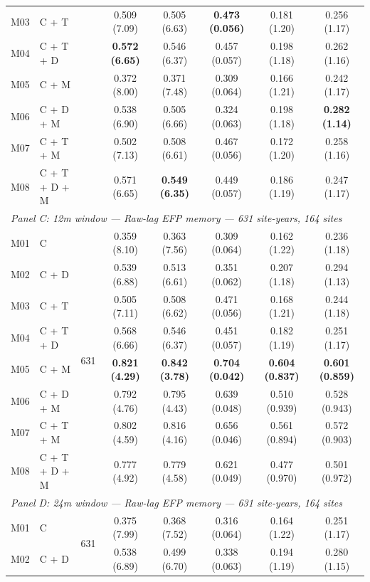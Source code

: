 \begin{table}[htbp]
\begin{tabular}{llcccccc}
M03 & C + T &  & 0.509 (7.09) & 0.505 (6.63) & \textbf{0.473 (0.056)} & 0.181 (1.20) & 0.256 (1.17) \\
M04 & C + T + D &  & \textbf{0.572 (6.65)} & 0.546 (6.37) & 0.457 (0.057) & 0.198 (1.18) & 0.262 (1.16) \\
M05 & C + M &  & 0.372 (8.00) & 0.371 (7.48) & 0.309 (0.064) & 0.166 (1.21) & 0.242 (1.17) \\
M06 & C + D + M &  & 0.538 (6.90) & 0.505 (6.66) & 0.324 (0.063) & 0.198 (1.18) & \textbf{0.282 (1.14)} \\
M07 & C + T + M &  & 0.502 (7.13) & 0.508 (6.61) & 0.467 (0.056) & 0.172 (1.20) & 0.258 (1.16) \\
M08 & C + T + D + M &  & 0.571 (6.65) & \textbf{0.549 (6.35)} & 0.449 (0.057) & 0.186 (1.19) & 0.247 (1.17) \\
\midrule
\multicolumn{8}{l}{\textit{Panel C: 12m window --- Raw-lag EFP memory --- 631 site-years, 164 sites}} \\
\midrule
M01 & C & \multirow{8}{*}{631} & 0.359 (8.10) & 0.363 (7.56) & 0.309 (0.064) & 0.162 (1.22) & 0.236 (1.18) \\
M02 & C + D &  & 0.539 (6.88) & 0.513 (6.61) & 0.351 (0.062) & 0.207 (1.18) & 0.294 (1.13) \\
M03 & C + T &  & 0.505 (7.11) & 0.508 (6.62) & 0.471 (0.056) & 0.168 (1.21) & 0.244 (1.18) \\
M04 & C + T + D &  & 0.568 (6.66) & 0.546 (6.37) & 0.451 (0.057) & 0.182 (1.19) & 0.251 (1.17) \\
M05 & C + M &  & \textbf{0.821 (4.29)} & \textbf{0.842 (3.78)} & \textbf{0.704 (0.042)} & \textbf{0.604 (0.837)} & \textbf{0.601 (0.859)} \\
M06 & C + D + M &  & 0.792 (4.76) & 0.795 (4.43) & 0.639 (0.048) & 0.510 (0.939) & 0.528 (0.943) \\
M07 & C + T + M &  & 0.802 (4.59) & 0.816 (4.16) & 0.656 (0.046) & 0.561 (0.894) & 0.572 (0.903) \\
M08 & C + T + D + M &  & 0.777 (4.92) & 0.779 (4.58) & 0.621 (0.049) & 0.477 (0.970) & 0.501 (0.972) \\
\midrule
\multicolumn{8}{l}{\textit{Panel D: 24m window --- Raw-lag EFP memory --- 631 site-years, 164 sites}} \\
\midrule
M01 & C & \multirow{8}{*}{631} & 0.375 (7.99) & 0.368 (7.52) & 0.316 (0.064) & 0.164 (1.22) & 0.251 (1.17) \\
M02 & C + D &  & 0.538 (6.89) & 0.499 (6.70) & 0.338 (0.063) & 0.194 (1.19) & 0.280 (1.15) \\

\end{tabular}
\end{table}
